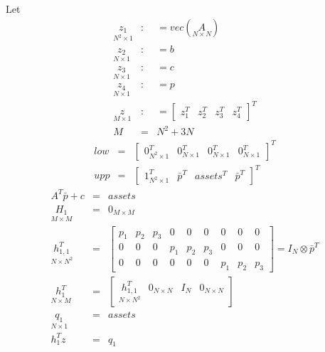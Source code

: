 \documentclass{article}
\begin{document}
Let%
\begin{eqnarray*}
\underset{N^{2}\times 1}{z_{1}} &:&=vec\left( \underset{N\times N}{A}\right) 
\\
\underset{N\times 1}{z_{2}} &:&=b \\
\underset{N\times 1}{z_{3}} &:&=c \\
\underset{N\times 1}{z_{4}} &:&=p \\
\underset{M\times 1}{z} &:&=\left[ 
\begin{array}{cccc}
z_{1}^{T} & z_{2}^{T} & z_{3}^{T} & z_{4}^{T}%
\end{array}%
\right] ^{T} \\
M &=&N^{2}+3N
\end{eqnarray*}%
\begin{eqnarray*}
low &=&\left[ 
\begin{array}{cccc}
0_{N^{2}\times 1}^{T} & 0_{N\times 1}^{T} & 0_{N\times 1}^{T} & 0_{N\times
1}^{T}%
\end{array}%
\right] ^{T} \\
upp &=&\left[ 
\begin{array}{cccc}
1_{N^{2}\times 1}^{T} & \bar{p}^{T} & assets^{T} & \bar{p}^{T}%
\end{array}%
\right] ^{T}
\end{eqnarray*}%
\begin{eqnarray*}
A^{T}\bar{p}+c &=&assets \\
\underset{M\times M}{H_{1}} &=&0_{M\times M} \\
\underset{N\times N^{2}}{h_{1,1}^{T}} &=&\left[ 
\begin{array}{ccccccccc}
p_{1} & p_{2} & p_{3} & 0 & 0 & 0 & 0 & 0 & 0 \\ 
0 & 0 & 0 & p_{1} & p_{2} & p_{3} & 0 & 0 & 0 \\ 
0 & 0 & 0 & 0 & 0 & 0 & p_{1} & p_{2} & p_{3}%
\end{array}%
\right] =I_{N}\otimes \bar{p}^{T} \\
\underset{N\times M}{h_{1}^{T}} &=&\left[ 
\begin{array}{cccc}
\underset{N\times N^{2}}{h_{1,1}^{T}} & 0_{N\times N} & I_{N} & 0_{N\times N}%
\end{array}%
\right]  \\
\underset{N\times 1}{q_{1}} &=&assets \\
h_{1}^{T}z &=&q_{1}
\end{eqnarray*}%
\end{document}

